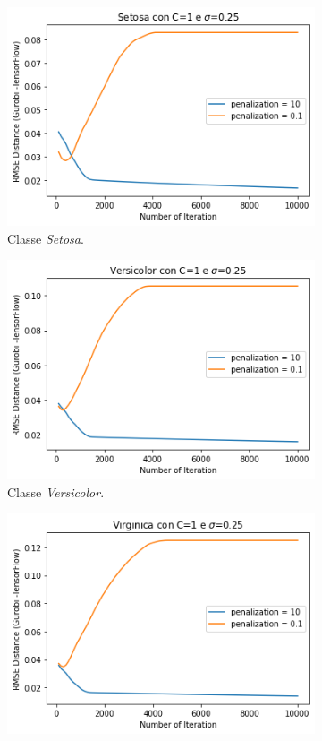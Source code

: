\documentclass[a4paper,12pt]{report}
\begin{document}
\begin{figure}[H]
    \begin{subfigure}{0.47\textwidth}
        \centering
        \includegraphics[scale=0.5]{images/Grafici/Setosa_DiffPen_10k.png}
        \caption{Classe \textit{Setosa}.}
        \label{subfig:Setosa_diffPen_10k}
    \end{subfigure}
    \begin{subfigure}{0.47\textwidth}
        \centering
        \includegraphics[scale=0.5]{images/Grafici/Versicolor_DiffPen_10k.png}
        \caption{Classe \textit{Versicolor}.}
        \label{subfig:Versicolor_diffPen_10k}
    \end{subfigure}
    \newline
    \begin{subfigure}{\textwidth}
        \centering
        \includegraphics[scale=0.5]{images/Grafici/Virginica_DiffPen_10k.png}

\end{subfigure}
\end{figure}
\end{document}
